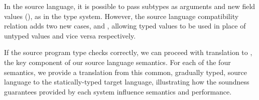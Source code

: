 \documentclass[runnningheads]{tex/llncs}
\begin{document}
In the source language, it is possible to pass subtypes as arguments and new
field values (), as in the \kafka type system. 
However, the source language compatibility relation adds two new
cases,  and , allowing typed values
to be used in place of untyped values and vice versa respectively.

If the source program type checks correctly, we can proceed with translation to
\kafka, the key component of our source language semantics. For each of the
four semantics, we provide a translation from this common,
gradually typed, source language to the statically-typed \kafka target
language, illustrating how the soundness guarantees provided by each system
influence semantics and performance.

%
%
%
%
%
\end{document}
